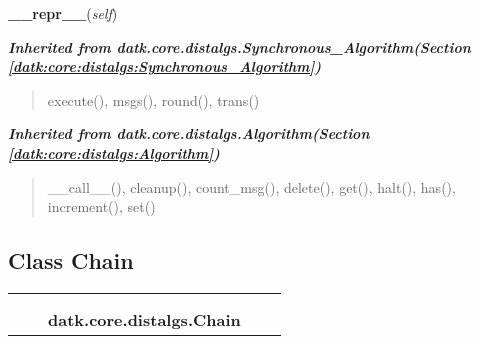    \vspace{0.5ex}

\hspace{.8\funcindent}\begin{boxedminipage}{\funcwidth}

    \raggedright \textbf{\_\_repr\_\_}(\textit{self})

\setlength{\parskip}{2ex}
\setlength{\parskip}{1ex}
    \end{boxedminipage}


\large{\textbf{\textit{Inherited from datk.core.distalgs.Synchronous\_Algorithm\textit{(Section \ref{datk:core:distalgs:Synchronous_Algorithm})}}}}

\begin{quote}
execute(), msgs(), round(), trans()
\end{quote}

\large{\textbf{\textit{Inherited from datk.core.distalgs.Algorithm\textit{(Section \ref{datk:core:distalgs:Algorithm})}}}}

\begin{quote}
\_\_call\_\_(), cleanup(), count\_msg(), delete(), get(), halt(), has(), increment(), set()
\end{quote}


\subsection{Class Chain}

    \label{datk:core:distalgs:Chain}
\begin{tabular}{cccccc}
\multicolumn{2}{r}{\settowidth{\BCL}{datk.core.distalgs.Algorithm}\multirow{2}{\BCL}{datk.core.distalgs.Algorithm}}
&&
  \\\cline{3-3}
  &&\multicolumn{1}{c|}{}
&&
  \\
&&\multicolumn{2}{l}{\textbf{datk.core.distalgs.Chain}}
\end{tabular}


